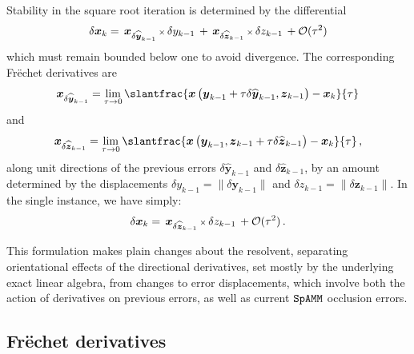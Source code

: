 \documentclass[letterpaper,twocolumn,amsmath,amsfont,amssymb,english,aps,jcp,preprintnumbers,groupaddress,nofootinbib,tightenlines,floatfix]{revtex4}
\newcommand{\mat}[1]{\boldsymbol{#1}}
\theoremstyle{plain}
\theoremstyle{remark}
\theoremstyle{plain}
\begin{document}
Stability in the square root iteration is determined  by the differential 
\begin{equation} \label{firstorderdual}
\delta \mat{x}_k = \,  { \mat{x}}_{\delta \widehat{\mat{y}}_{k-1}}  \, {\scriptstyle \times} \, \delta y_{k-1}
                 \, + \,  { \mat{x}}_{\delta \widehat{\mat{z}}_{k-1}}  \, {\scriptstyle \times} \, \delta z_{k-1}  \, + {\cal O}(\tau^2) 
\end{equation}
which must remain bounded below one to avoid divergence.   The corresponding Fr\"{e}chet derivatives are
\begin{equation}
  \mat{x}_{\delta \widehat{ \mat{y}}_{k-1}}
= \lim_{\tau \rightarrow 0} \slantfrac{ \mat{x} \left( \mat{y}_{k-1} + \tau \delta \widehat{\mat{y}}_{k-1} ,  {\mat{z}}_{k-1}  \right)
                                     -\mat{x}_k    }{\tau} 
 \end{equation}
and
 \begin{equation}
 \mat{x}_{\delta \widehat{ \mat{z}}_{k-1}} = \lim_{\tau \rightarrow 0}
\slantfrac{ \mat{x} \left( {\mat{y}}_{k-1} , \mat{z}_{k-1} +\tau  \delta \widehat{\mat{z}}_{k-1} \right) - \mat{x}_k   }{\tau}  \, , 
 \end{equation}
along unit directions of the previous errors $\delta \widehat{\mat{y}}_{k-1}$ and $\delta \widehat{\mat{z}}_{k-1}$, by an amount
determined by the displacements $\delta y_{k-1} = \lVert \delta \mat{y}_{k-1} \rVert$  and  $\delta z_{k-1}=\lVert \delta \mat{z}_{k-1} \rVert$.
In the single instance, we have simply:
\begin{equation} \label{firstordersingle}
\delta \mat{x}_k = \,  { \mat{x}}_{\delta \widehat{\mat{z}}_{k-1}}  \, {\scriptstyle \times} \, \delta z_{k-1}  \, + {\cal O}(\tau^2)  \, .
\end{equation}

This formulation makes plain changes about the resolvent, separating orientational effects 
of the directional derivatives, set mostly by the underlying exact linear algebra, from 
changes to error displacements, which involve both the action of derivatives on previous errors,  as well as 
current $\tt SpAMM$ occlusion errors.

\subsection{Fr\"{e}chet derivatives}
 
\end{document}
